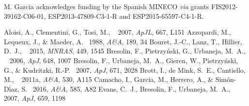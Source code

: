 \documentclass{iau}
\begin{document}
M. Garcia acknowledges funding by the Spanish MINECO
\textit{via} grants FIS2012-39162-C06-01, ESP2013-47809-C3-1-R and ESP2015-65597-C4-1-R.


\begin{thebibliography}{}

 

      {Aloisi, A., Clementini, G., Tosi, M., \etal\ } 2007, \textit{ApJL}, 667, L151
   {Azzopardi, M., Lequeux, J., \& Maeder, A.\ } 1988, \textit{A\&A}, 189, 34 
      {Bouret, J.-C., Lanz, T., Hillier, D.~J., \etal\ } 2015, \textit{MNRAS}, 449, 1545
    {Bresolin, F., Pietrzy{\'n}ski, G., Urbaneja, M.~A., \etal\ } 2006, \textit{ApJ}, 648, 1007 
    {Bresolin, F., Urbaneja, M.~A., Gieren, W., Pietrzy{\'n}ski, G., \& Kudritzki, R.-P.\ } 2007, \textit{ApJ}, 671, 2028
     {Brott, I., de Mink, S.~E., Cantiello, M., \etal\ } 2011a, \textit{A\&A}, 530, A115 
     {Camacho, I., Garcia, M., Herrero, A., \& Sim{\'o}n-D{\'{\i}}az, S.\ } 2016, \textit{A\&A}, 585, A82 
       {Evans, C.~J., Bresolin, F., Urbaneja, M.~A., \etal\ } 2007, \textit{ApJ}, 659, 1198 


\end{thebibliography}
\end{document}
